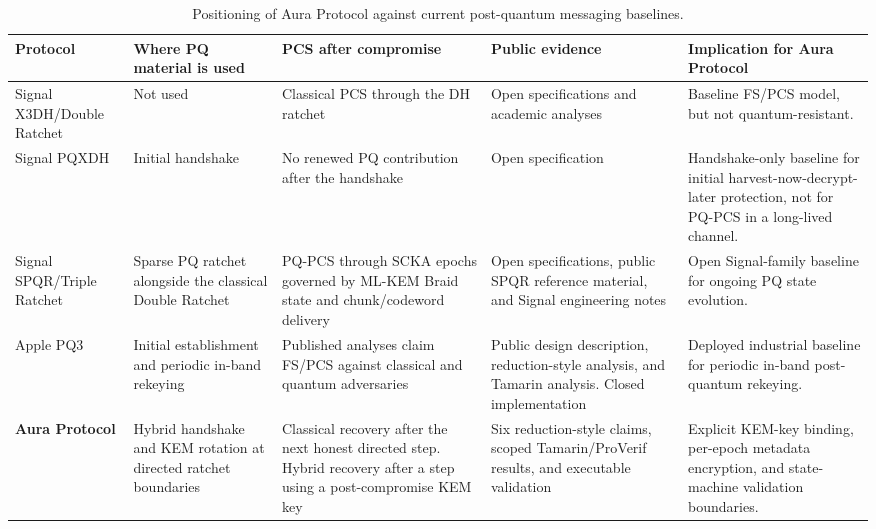 \documentclass[preprint,12pt]{elsarticle}
\theoremstyle{definition}
\newcommand{\tech}[1]{\textnormal{#1}}
\newcommand{\SPQR}{\tech{SPQR}}
\newcommand{\PQThree}{\tech{PQ3}}
\begin{document}
\begin{table}[H]
\centering
\caption{Positioning of Aura Protocol against current post-quantum messaging
baselines.}\label{tab:sota-comparison}
\scriptsize
\setlength{\tabcolsep}{2pt}
\begin{tabularx}{\textwidth}{@{}L{0.16\textwidth}L{0.19\textwidth}L{0.18\textwidth}L{0.17\textwidth}Y@{}}
\toprule
Protocol & Where PQ material is used & PCS after compromise & Public evidence & Implication for Aura Protocol \\
\midrule
Signal X3DH/Double Ratchet~\cite{signal-x3dh,signal-double-ratchet} &
Not used &
Classical PCS through the DH ratchet &
Open specifications and academic analyses &
Baseline FS/PCS model, but not quantum-resistant. \\
\addlinespace
Signal PQXDH~\cite{signal-pqxdh} &
Initial handshake &
No renewed PQ contribution after the handshake &
Open specification &
Handshake-only baseline for initial harvest-now-decrypt-later protection, not for PQ-PCS in a long-lived channel. \\
\addlinespace
Signal \SPQR{}/Triple Ratchet~\cite{signal-spqr,signal-double-ratchet,mlkem-braid,signal-spqr-artifact} &
Sparse PQ ratchet alongside the classical Double Ratchet &
PQ-PCS through SCKA epochs governed by ML-KEM Braid state and chunk/codeword delivery &
Open specifications, public SPQR reference material, and Signal engineering notes &
Open Signal-family baseline for ongoing PQ state evolution. \\
\addlinespace
Apple \PQThree{}~\cite{apple-pq3,stebila-pq3,linker-pq3} &
Initial establishment and periodic in-band rekeying &
Published analyses claim FS/PCS against classical and quantum adversaries &
Public design description, reduction-style analysis, and Tamarin analysis. Closed implementation &
Deployed industrial baseline for periodic in-band post-quantum rekeying. \\
\addlinespace
\textbf{Aura Protocol} &
Hybrid handshake and KEM rotation at directed ratchet boundaries &
Classical recovery after the next honest directed step. Hybrid recovery after a step using a post-compromise KEM key &
Six reduction-style claims, scoped Tamarin/ProVerif results, and executable validation &
Explicit KEM-key binding, per-epoch metadata encryption, and state-machine validation boundaries. \\
\bottomrule
\end{tabularx}
\end{table}
\end{document}
